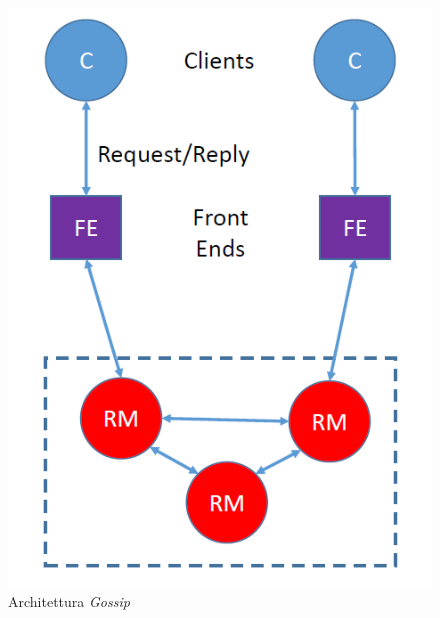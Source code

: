 \documentclass{article}
\begin{document}
\begin{figure}[H]
\centering
\includegraphics[scale=0.5]{img/Gossip.PNG}
\caption{Architettura \textit{Gossip}}
\end{figure}
\end{document}
